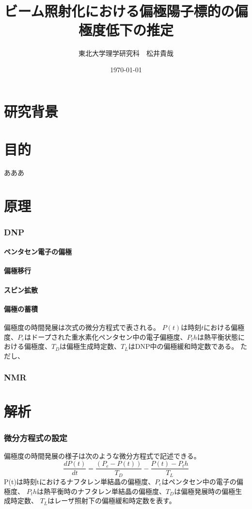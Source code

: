 \documentclass[a5j]{jsarticle}
\title{ビーム照射化における偏極陽子標的の偏極度低下の推定}
\author{東北大学理学研究科　松井貴哉}
\date{\today}
\begin{document}
\maketitle
\part{研究背景}

\part{目的}
あああ
\part{原理}
\section{DNP}
\subsection{ペンタセン電子の偏極}
\subsection{偏極移行}
\subsection{スピン拡散}
\subsection{偏極の蓄積}
偏極度の時間発展は次式の微分方程式で表される。
$P(t)$は時刻$t$における偏極度、$P_e$はドープされた重水素化ペンタセン中の電子偏極度、$P_th$は熱平衡状態における偏極度、$T_D$は偏極生成時定数、$T_L$はDNP中の偏極緩和時定数である。
ただし、


\section{NMR}


\part{解析}

\section{微分方程式の設定}
偏極度の時間発展の様子は次のような微分方程式で記述できる。
\begin{equation}
  \frac{dP(t)}{dt}=\frac{(P_e-P(t))}{T_D}-\frac{P(t)-P_th}{T_L}
\end{equation}
P(t)は時刻tにおけるナフタレン単結晶の偏極度、$P_e$はペンタセン中の電子の偏極度、
$P_th$は熱平衡時のナフタレン単結晶の偏極度、$T_D$は偏極発展時の偏極生成時定数、 $T_L$はレーザ照射下の偏極緩和時定数を表す。
\end{document}
